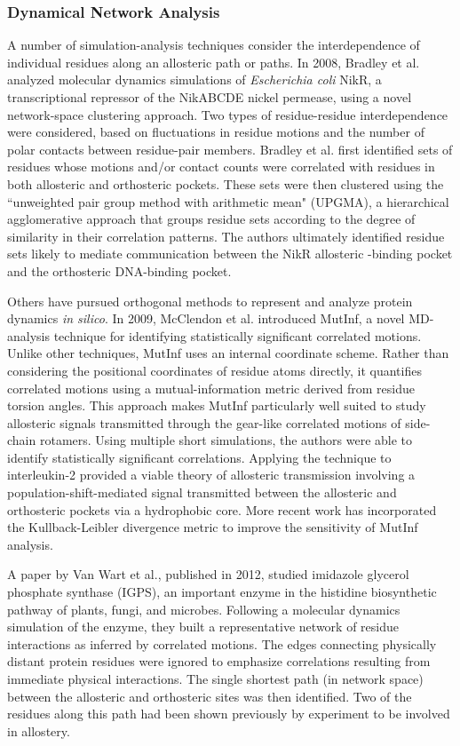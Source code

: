 \subsubsection{Dynamical Network Analysis}
\par A number of simulation-analysis techniques consider the interdependence of individual residues along an allosteric path or paths. In 2008, Bradley et al. analyzed molecular dynamics simulations of \textit{Escherichia coli} NikR, a transcriptional repressor of the NikABCDE nickel permease, using a novel network-space clustering approach.\cite{Bradley2008c} Two types of residue-residue interdependence were considered, based on fluctuations in residue motions and the number of polar contacts between residue-pair members. Bradley et al. first identified sets of residues whose motions and/or contact counts were correlated with residues in both allosteric and orthosteric pockets. These sets were then clustered using the ``unweighted pair group method with arithmetic mean" (UPGMA), a hierarchical agglomerative approach that groups residue sets according to the degree of similarity in their correlation patterns. The authors ultimately identified residue sets likely to mediate communication between the NikR allosteric -binding pocket and the orthosteric DNA-binding pocket.
\par Others have pursued orthogonal methods to represent and analyze protein dynamics \textit{in silico}. In 2009, McClendon et al. introduced MutInf, a novel MD-analysis technique for identifying statistically significant correlated motions.\cite{McClendon2009a} Unlike other techniques, MutInf uses an internal coordinate scheme. Rather than considering the positional coordinates of residue atoms directly, it quantifies correlated motions using a mutual-information metric derived from residue torsion angles. This approach makes MutInf particularly well suited to study allosteric signals transmitted through the gear-like correlated motions of side-chain rotamers. Using multiple short simulations, the authors were able to identify statistically significant correlations. Applying the technique to interleukin-2 provided a viable theory of allosteric transmission involving a population-shift-mediated signal transmitted between the allosteric and orthosteric pockets via a hydrophobic core. More recent work has incorporated the Kullback-Leibler divergence metric to improve the sensitivity of MutInf analysis.\cite{McClendon2012}
\par A paper by Van Wart et al., published in 2012, studied imidazole glycerol phosphate synthase (IGPS), an important enzyme in the histidine biosynthetic pathway of plants, fungi, and microbes.\cite{VanWart2012a} Following a molecular dynamics simulation of the enzyme, they built a representative network of residue interactions as inferred by correlated motions. The edges connecting physically distant protein residues were ignored to emphasize correlations resulting from immediate physical interactions. The single shortest path (in network space) between the allosteric and orthosteric sites was then identified. Two of the residues along this path had been shown previously by experiment to be involved in allostery.
